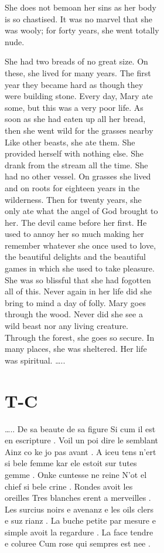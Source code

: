 \documentclass[
  letterpaper,
  DIV=11,
  numbers=noendperiod,
  oneside]{scrreprt}
\begin{document}
\begin{figure}
\begin{figure}
\begin{figure}
\begin{minipage}{0.20\linewidth}
{She does not bemoan her sins} {as her body is so chastised.} {It was no
marvel that she was wooly;} {for forty years, she went totally nude.}

She had two breads of no great size. On these, she lived for many years.
The first year they became hard as though they were building stone.
Every day, Mary ate some, but this was a very {poor life}. As soon as
she had eaten up all her bread, then she went wild for the grasses
nearby Like other beasts, she ate them. She provided herself with
nothing else. She drank from the stream all the time. She had no other
vessel. On grasses she lived and on roots for eighteen years in the
wilderness. Then for twenty years, she only ate what the angel of God
brought to her. The devil came before her first. He used to {annoy} her
so much making her remember whatever she once used to love, the
beautiful delights and the beautiful {games} in which she used to take
{pleasure}. She was so blissful that she had fogotten all of this. Never
again in her life did she bring to mind a day of folly. Mary goes
through the wood. Never did she see a wild beast nor any living
creature. Through the forest, she goes so secure. In many places, she
was sheltered. Her life was spiritual. \ldots..

\end{minipage}%
%
\begin{minipage}{0.20\linewidth}

\section{T-C}\label{t-c-1}

\ldots.. De sa beaute de sa figure Si cum il est en escripture . Voil un
poi dire le semblant Ainz co ke jo pas avant . {A iceu tens {n'}ert si
bele femme} {kar ele estoit sur tutes gemme .} {Onke} cuntesse {ne}
reine {N'}ot el chief si bele crine . Rondes avoit les oreilles Tres
{blanches} erent a merveilles . Les surcius {noirs} e avenanz e les oils
{clers} e suz rianz . La buche petite par mesure e {simple} avoit la
regardure . La face tendre e {coluree} {Cum rose qui sempres est nee .}


\end{minipage}
\end{figure}
\end{figure}
\end{figure}
\end{document}
